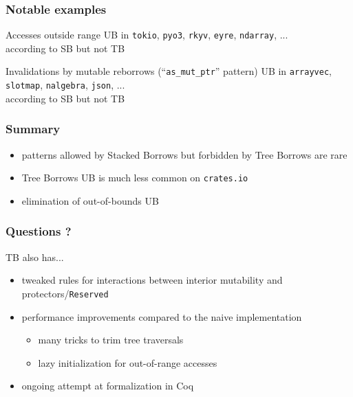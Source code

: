\begin{frame}
    \frametitle{Notable examples}
    \begin{block}{Accesses outside range}
        UB in \texttt{tokio}, \texttt{pyo3}, \texttt{rkyv}, \texttt{eyre}, \texttt{ndarray}, ...\\
        according to SB but not TB
    \end{block}
    \begin{block}{Invalidations by mutable reborrows (``\texttt{as\_mut\_ptr}'' pattern)}
        UB in \texttt{arrayvec}, \texttt{slotmap}, \texttt{nalgebra}, \texttt{json}, ...\\
        according to SB but not TB
    \end{block}
\end{frame}

\begin{frame}
    \frametitle{Summary}
    \begin{itemize}
        \item patterns allowed by Stacked Borrows but forbidden by Tree Borrows are rare
        \item Tree Borrows UB is much less common on \texttt{crates.io}
        \item elimination of out-of-bounds UB
    \end{itemize}
\end{frame}

\begin{frame}
    \frametitle{Questions ?}

    TB also has...
    \begin{itemize}
        \item tweaked rules for interactions between interior mutability and protectors/\texttt{Reserved}
        \item performance improvements compared to the naive implementation
            \begin{itemize}
                \item many tricks to trim tree traversals
                \item lazy initialization for out-of-range accesses
            \end{itemize}
        \item ongoing attempt at formalization in Coq
    \end{itemize}
\end{frame}
